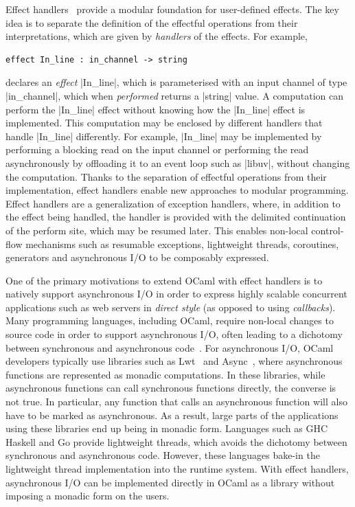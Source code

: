 \documentclass[sigplan,screen]{acmart}
\begin{document}
Effect handlers~\cite{Plotkin09} provide a modular foundation for user-defined
effects. The key idea is to separate the definition of the effectful operations
from their interpretations, which are given by \emph{handlers} of the effects.
For example,
%
\begin{lstlisting}
effect In_line : in_channel -> string
\end{lstlisting}
%
declares an \emph{effect} |In_line|, which is parameterised with an input
channel of type |in_channel|, which when \emph{performed} returns a |string|
value. A computation can perform the |In_line| effect without knowing how the
|In_line| effect is implemented. This computation may be enclosed by different
handlers that handle |In_line| differently. For example, |In_line| may be
implemented by performing a blocking read on the input channel or performing
the read asynchronously by offloading it to an event loop such as |libuv|,
without changing the computation. Thanks to the separation of effectful
operations from their implementation, effect handlers enable new approaches to
modular programming. Effect handlers are a generalization of exception
handlers, where, in addition to the effect being handled, the handler is
provided with the delimited continuation~\cite{Danvy90} of the perform site,
which may be resumed later. This enables non-local control-flow mechanisms such
as resumable exceptions, lightweight threads, coroutines, generators and
asynchronous I/O to be composably expressed.

One of the primary motivations to extend OCaml with effect handlers is to
natively support asynchronous I/O in order to express highly scalable
concurrent applications such as web servers in \emph{direct style} (as opposed
to using \emph{callbacks}). Many programming languages, including OCaml,
require non-local changes to source code in order to support asynchronous I/O,
often leading to a dichotomy between synchronous and asynchronous
code~\cite{colour}. For asynchronous I/O, OCaml developers typically use
libraries such as Lwt~\cite{lwt} and Async~\cite{async}, where asynchronous
functions are represented as monadic computations. In these libraries, while
asynchronous functions can call synchronous functions directly, the converse is
not true. In particular, any function that calls an asynchronous function will
also have to be marked as asynchronous. As a result, large parts of the
applications using these libraries end up being in monadic form. Languages such
as GHC Haskell and Go provide lightweight threads, which avoids the dichotomy
between synchronous and asynchronous code. However, these languages bake-in the
lightweight thread implementation into the runtime system. With effect
handlers, asynchronous I/O can be implemented directly in OCaml as a library
without imposing a monadic form on the users.
\end{document}
